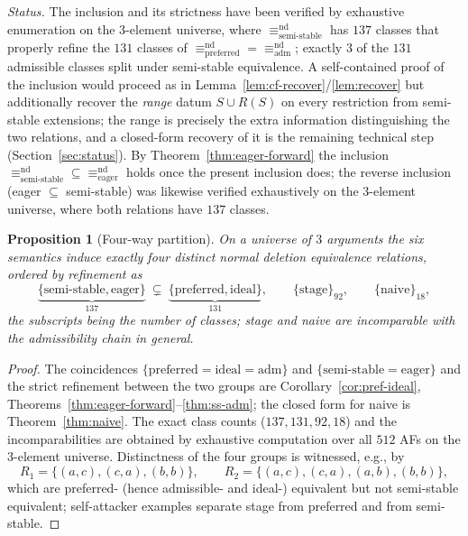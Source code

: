 \documentclass{amsart}
\newtheorem{proposition}[theorem]{Proposition}
\theoremstyle{remark}
\begin{document}
\noindent\emph{Status.}  The inclusion and its strictness have been verified by
exhaustive enumeration on the $3$-element universe, where
$\equiv^{\mathrm{nd}}_{\mathrm{semi\text{-}stable}}$ has $137$ classes that
properly refine the $131$ classes of
$\equiv^{\mathrm{nd}}_{\mathrm{preferred}}=\equiv^{\mathrm{nd}}_{\mathrm{adm}}$;
exactly $3$ of the $131$ admissible classes split under semi-stable equivalence.
A self-contained proof of the inclusion would proceed as in
Lemma~\ref{lem:cf-recover}/\ref{lem:recover} but additionally recover the
\emph{range} datum $S\cup R(S)$ on every restriction from semi-stable
extensions; the range is precisely the extra information distinguishing the two
relations, and a closed-form recovery of it is the remaining technical step
(Section~\ref{sec:status}).  By Theorem~\ref{thm:eager-forward} the inclusion
$\equiv^{\mathrm{nd}}_{\mathrm{semi\text{-}stable}}\subseteq
\equiv^{\mathrm{nd}}_{\mathrm{eager}}$ holds once the present inclusion does; the
reverse inclusion (eager $\subseteq$ semi-stable) was likewise verified
exhaustively on the $3$-element universe, where both relations have $137$
classes.

\begin{proposition}[Four-way partition]\label{prop:partition}
On a universe of $3$ arguments the six semantics induce exactly four distinct
normal deletion equivalence relations, ordered by refinement as
\[
\underbrace{\{\mathrm{semi\text{-}stable},\mathrm{eager}\}}_{137}
\ \subsetneq\
\underbrace{\{\mathrm{preferred},\mathrm{ideal}\}}_{131},
\qquad
\{\mathrm{stage}\}_{92},
\qquad
\{\mathrm{naive}\}_{18},
\]
the subscripts being the number of classes; stage and naive are incomparable
with the admissibility chain in general.
\end{proposition}

\begin{proof}
The coincidences $\{\mathrm{preferred}=\mathrm{ideal}=\mathrm{adm}\}$ and
$\{\mathrm{semi\text{-}stable}=\mathrm{eager}\}$ and the strict refinement
between the two groups are Corollary~\ref{cor:pref-ideal},
Theorems~\ref{thm:eager-forward}--\ref{thm:ss-adm}; the closed form for naive is
Theorem~\ref{thm:naive}.  The exact class counts ($137,131,92,18$) and the
incomparabilities are obtained by exhaustive computation over all $512$ AFs on
the $3$-element universe.  Distinctness of the four groups is witnessed, e.g., by
\[
R_1=\{(a,c),(c,a),(b,b)\},\qquad
R_2=\{(a,c),(c,a),(a,b),(b,b)\},
\]
which are preferred- (hence admissible- and ideal-) equivalent but not
semi-stable equivalent; self-attacker examples separate stage from preferred and
from semi-stable.
\end{proof}
\end{document}

